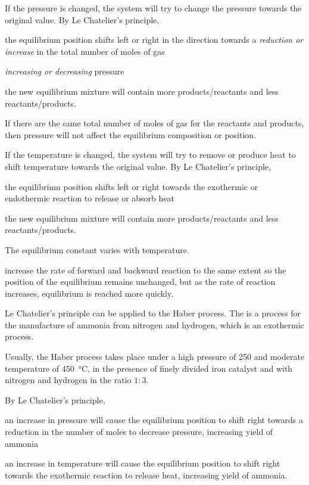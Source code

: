 \documentclass[Chemistry.tex]{subfiles}
\begin{document}
If the pressure is changed, the system will try to change the pressure towards the original value. By Le Chatelier's principle, \begin{slinenum}
\item the equilibrium position shifts left or right in the direction towards a \emph{reduction or increase} in the total number of moles of gas
\item \emph{increasing or decreasing} pressure
\item the new equilibrium mixture will contain more products\slash reactants and less reactants\slash products.
\end{slinenum} If there are the same total number of moles of gas for the reactants and products, then pressure will not affect the equilibrium composition or position.

If the temperature is changed, the system will try to remove or produce heat to shift temperature towards the original value. By Le Chatelier's principle, \begin{slinenum}
\item the equilibrium position shifts left or right towards the exothermic or endothermic reaction to release or absorb heat
\item the new equilibrium mixture will contain more products\slash reactants and less reactants\slash products.
\end{slinenum} The equilibrium constant varies with temperature.

 increase the rate of forward and backward reaction to the same extent so the position of the equilibrium remains unchanged, but as the rate of reaction increases, equilibrium is reached more quickly.

Le Chatelier's principle can be applied to the Haber process. The  is a process for the manufacture of ammonia from nitrogen and hydrogen, which is an exothermic process.

Usually, the Haber process takes place under a high pressure of \SI{250}{\atmosphere} and moderate temperature of \SI{450}{\celsius}, in the presence of finely divided iron catalyst and with nitrogen and hydrogen in the ratio \(1 : 3\).

By Le Chatelier's principle, \begin{slinenum}
\item an increase in pressure will cause the equilibrium position to shift right towards a reduction in the number of moles to decrease pressure, increasing yield of ammonia
\item an increase in temperature will cause the equilibrium position to shift right towards the exothermic reaction to release heat, increasing yield of ammonia.
\end{slinenum}
\end{document}
